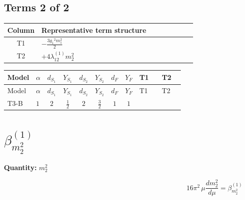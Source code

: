 \documentclass[8pt]{article}
\begin{document}
\begin{landscape}
\subsection*{Terms 2 of 2}
\begin{center}
\begin{tabular}{@{}c >{\raggedright\arraybackslash}p{0.82\linewidth}@{}}
\toprule
Column & Representative term structure \\
\midrule
T1 & \(\displaystyle -\frac{3 {g_1}^2 {m_1^2}}{2}\) \\
\midrule
T2 & \(\displaystyle +4 {\lambda_{12}^{(1)}} {m_2^2}\) \\
\midrule
\bottomrule
\end{tabular}
\end{center}
\smallskip
\tiny
\begin{longtable}{@{}llcccccc >{\raggedright\arraybackslash}p{0.21\linewidth} >{\raggedright\arraybackslash}p{0.21\linewidth}@{}}
\toprule
Model & $\alpha$ & $d_{S_1}$ & $Y_{S_1}$ & $d_{S_2}$ & $Y_{S_2}$ & $d_F$ & $Y_F$ & T1 & T2 \\
\midrule
\endfirsthead
\toprule
Model & $\alpha$ & $d_{S_1}$ & $Y_{S_1}$ & $d_{S_2}$ & $Y_{S_2}$ & $d_F$ & $Y_F$ & T1 & T2 \\
\midrule
\endhead
T3-B & $1$ & $2$ & $\frac{1}{2}$ & $2$ & $\frac{3}{2}$ & $1$ & $1$ & \scriptsize\adjustbox{max width=\linewidth}{$\begin{gathered} -\frac{3 {g_1}^2 {m_1^2}}{2}\end{gathered}$} & \scriptsize\adjustbox{max width=\linewidth}{$\begin{gathered} +4 {\lambda_{12}^{(1)}} {m_2^2}\end{gathered}$} \\
\midrule
\bottomrule
\end{longtable}
\clearpage
\section*{$\beta_{m_2^2}^{(1)}$}
\noindent\textbf{Quantity: }$m_2^2$\par\smallskip
\[16\pi^2\,\mu\frac{d m_2^2}{d\mu}=\beta_{m_2^2}^{(1)}\]

\end{landscape}
\end{document}
